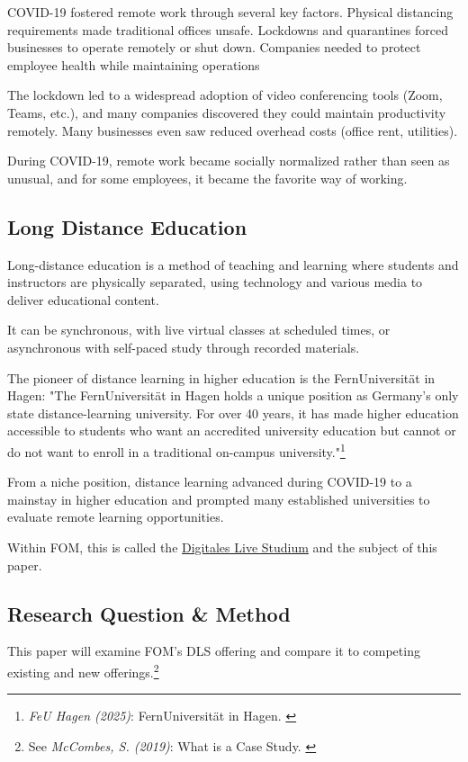 COVID-19 fostered remote work through several key factors. Physical distancing requirements made traditional offices unsafe. Lockdowns and quarantines forced businesses to operate remotely or shut down. Companies needed to protect employee health while maintaining operations

The lockdown led to a widespread adoption of video conferencing tools (Zoom, Teams, etc.), and many companies discovered they could maintain productivity remotely. Many businesses even saw reduced overhead costs (office rent, utilities).

During COVID-19, remote work became socially normalized rather than seen as unusual, and for some employees, it became the favorite way of working.

\subsection{Long Distance Education}

Long-distance education is a method of teaching and learning where students and instructors are physically separated, using technology and various media to deliver educational content.

It can be synchronous, with live virtual classes at scheduled times, or asynchronous with self-paced study through recorded materials.

The pioneer of distance learning in higher education is the FernUniversität in Hagen: "The FernUniversität in Hagen holds a unique position as Germany's only state distance-learning university. For over 40 years, it has made higher education accessible to students who want an accredited university education but cannot or do not want to enroll in a traditional on-campus university."\footnote{\textit{FeU Hagen (2025)}: FernUniversität in Hagen. \cite{feuHagen}}

From a niche position, distance learning advanced during COVID-19 to a mainstay in higher education and prompted many established universities to evaluate remote learning opportunities.

Within FOM, this is called the \href{https://www.fom.de/digital.html}{Digitales Live Studium} and the subject of this paper.

\subsection{Research Question \& Method}

This paper will examine FOM's DLS offering and compare it to competing existing and new offerings.\footnote{See \textit{McCombes, S. (2019)}: What is a Case Study. \cite{caseScribbr}}

